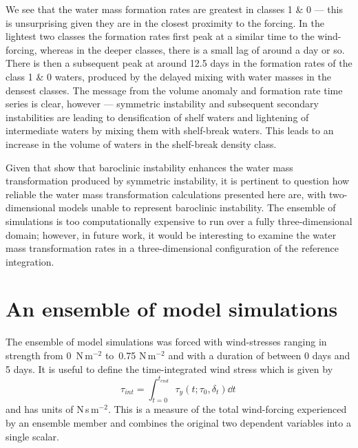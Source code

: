 We see that the water mass formation rates are greatest in classes 1 \& 0 --- this is unsurprising given they are in the closest proximity to the forcing. In the lightest two classes the formation rates first peak at a similar time to the wind-forcing, whereas in the deeper classes, there is a small lag of around a day or so. There is then a subsequent peak at around 12.5 days in the formation rates of the class 1 \& 0 waters, produced by the delayed mixing with water masses in the densest classes. The message from the volume anomaly and formation rate time series is clear, however --- symmetric instability and subsequent secondary instabilities are leading to densification of shelf waters and lightening of intermediate waters by mixing them with shelf-break waters. This leads to an increase in the volume of waters in the shelf-break density class.

Given that \citet{Spall2016} show that baroclinic instability enhances the water mass transformation produced by symmetric instability, it is pertinent to question how reliable the water mass transformation calculations presented here are, with two-dimensional models unable to represent baroclinic instability. The ensemble of simulations is too computationally expensive to run over a fully three-dimensional domain; however, in future work, it would be interesting to examine the water mass transformation rates in a three-dimensional configuration of the reference integration.

\section{An ensemble of model simulations}
\label{sec:IrmEns}
The ensemble of model simulations was forced with wind-stresses ranging in strength from 0~N\,m$^{-2}$ to~0.75 N\,m$^{-2}$ and with a duration of between 0 days and 5 days. It is useful to define the time-integrated wind stress which is given by
\begin{equation}
    \tau_{int} = \int^{t_{end}}_{t=0} \tau_y(t; \tau_0, \delta_t)\dd t \,
\end{equation}
and has units of N\,s\,m$^{-2}$. This is a measure of the total wind-forcing experienced by an ensemble member and combines the original two dependent variables into a single scalar.

